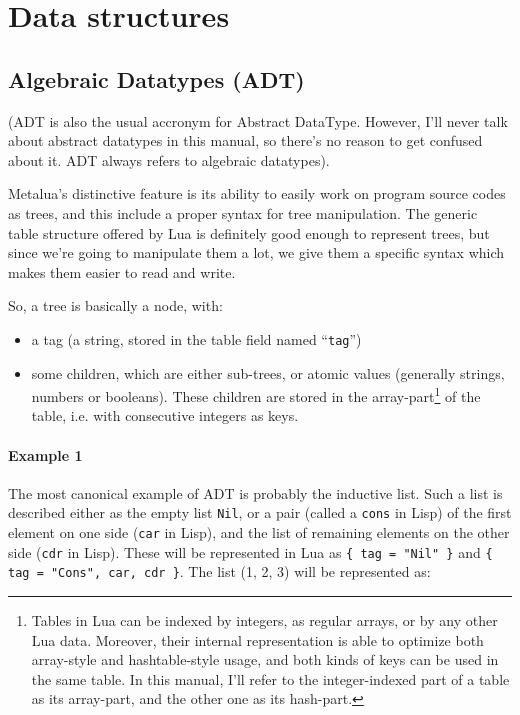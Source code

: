 \section{Data structures}

\subsection{Algebraic Datatypes (ADT)}

(ADT is also the usual accronym for Abstract DataType. However, I'll
never talk about abstract datatypes in this manual, so there's no
reason to get confused about it. ADT always refers to algebraic
datatypes).

Metalua's distinctive feature is its ability to easily work on program
source codes as trees, and this include a proper syntax for tree
manipulation. The generic table structure offered by Lua is
definitely good enough to represent trees, but since we're going to
manipulate them a lot, we give them a specific syntax which makes them
easier to read and write.

So, a tree is basically a node, with:
\begin{itemize}
\item a tag (a string, stored in the table field named ``{\tt tag}'')
\item some children, which are either sub-trees, or atomic values
  (generally strings, numbers or booleans). These children are stored
  in the array-part\footnote{Tables in Lua can be indexed by integers,
    as regular arrays, or by any other Lua data. Moreover, their
    internal representation is able to optimize both array-style and
    hashtable-style usage, and both kinds of keys can be used in the
    same table. In this manual, I'll refer to the integer-indexed part
    of a table as its array-part, and the other one as its hash-part.}
  of the table, i.e. with consecutive integers as keys.
\end{itemize}

\paragraph{Example 1}

The most canonical example of ADT is probably the inductive list. Such
a list is described either as the empty list \verb+Nil+, or a pair
(called a \verb+cons+ in Lisp) of the first element on one side
(\verb+car+ in Lisp), and the list of remaining elements on the other
side (\verb+cdr+ in Lisp). These will be represented in Lua as
\verb+{ tag = "Nil" }+ and {\tt\{ tag = "Cons", car, cdr \}}. The list
(1, 2, 3) will be represented as:

